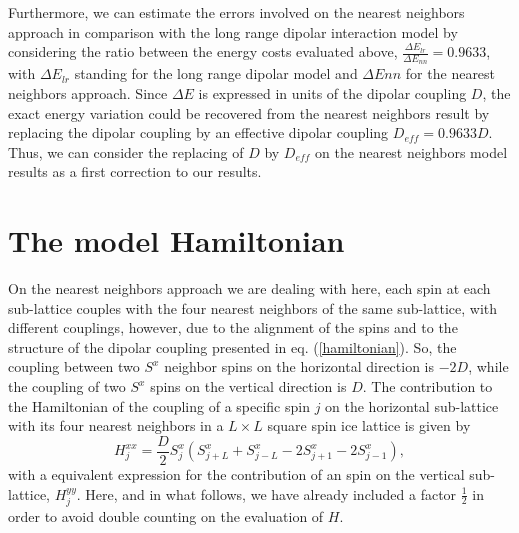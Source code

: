 \documentclass[aps,showkeys,groupedaddress]{revtex4}
\begin{document}
Furthermore, we can estimate the errors involved on the nearest neighbors approach in comparison with the long range dipolar interaction model by considering the ratio between the energy costs evaluated above, $\frac{\Delta E_{lr}}{\Delta E_{nn}} = 0.9633$, with $\Delta E_{lr}$ standing for the long range dipolar model and $\Delta E{nn}$ for the nearest neighbors approach. Since $\Delta E$ is expressed in units of the dipolar coupling $D$, the exact energy variation could be recovered from the nearest neighbors result by replacing the dipolar coupling by an effective dipolar coupling $D_{eff} = 0.9633 D$. Thus, we can consider the replacing of $D$ by $D_{eff}$ on the nearest neighbors model results as a first correction to our results.


\section{The model Hamiltonian} \label{nn2DSI}

On the nearest neighbors approach we are dealing with here, each spin at each sub-lattice couples with the four nearest neighbors of the same sub-lattice, with different couplings, however, due to the alignment of the spins and to the structure of the dipolar coupling presented in eq. (\ref{hamiltonian}). So, the coupling between two $S^x$ neighbor spins on the horizontal direction is $-2D$, while the coupling of two $S^x$ spins on the vertical direction is $D$. The contribution to the Hamiltonian of the coupling of a specific spin $j$ on the horizontal sub-lattice with its four nearest neighbors in a $L \times L$ square spin ice lattice is given by
\begin{equation}
H^{xx}_{j} = \frac{D}{2} S^x_{j} (S^x_{j+L} + S^x_{j-L} - 2 S^x_{j+1} - 2 S^x_{j-1}),
\end{equation}
with a equivalent expression for the contribution of an spin on the vertical sub-lattice, $H^{yy}_{j}$. Here, and in what follows, we have already included a factor $\frac{1}{2}$ in order to avoid double counting on the evaluation of $H$. 
\end{document}
